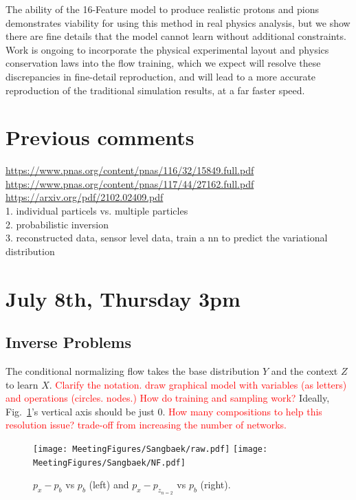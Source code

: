 The ability of the 16-Feature model to produce realistic protons and pions demonstrates viability for using this method in real physics analysis, but we show there are fine details that the model cannot learn without additional constraints. Work is ongoing to incorporate the physical experimental layout and physics conservation laws into the flow training, which we expect will resolve these discrepancies in fine-detail reproduction, and will lead to a more accurate reproduction of the traditional simulation results, at a far faster speed. 


\section{Previous comments}

\url{https://www.pnas.org/content/pnas/116/32/15849.full.pdf}\\
\url{https://www.pnas.org/content/pnas/117/44/27162.full.pdf}\\
\url{https://arxiv.org/pdf/2102.02409.pdf}
\\
1. individual particels vs. multiple particles\\
2. probabilistic inversion\\
3. reconstructed data, sensor level data, train a nn to predict the variational distribution\\

\section{July 8th, Thursday 3pm}
\subsection{Inverse Problems}

The conditional normalizing flow takes the base distribution $Y$ and the context $Z$ to learn $X$. \textcolor{red}{Clarify the notation. draw graphical model with variables (as letters) and operations (circles. nodes.) How do training and sampling work?} Ideally, Fig.~\ref{fig: jul8_NF}'s vertical axis should be just 0. \textcolor{red}{How many compositions to help this resolution issue? trade-off from increasing the number of networks.} 
\begin{figure}[!ht]
\centering
\texttt{[image: MeetingFigures/Sangbaek/raw.pdf]}
\texttt{[image: MeetingFigures/Sangbaek/NF.pdf]}
\label{fig: jul8_NF}
\caption{$p_x - p_{b}$ vs $p_{b}$ (left) and $p_x - p_{z_{n=2}}$ vs $p_{b}$ (right).}
\end{figure}

